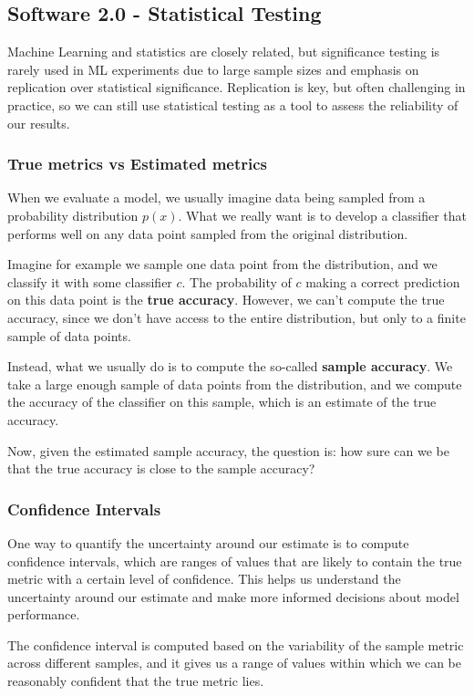 \subsection{Software 2.0 - Statistical Testing}
Machine Learning and statistics are closely related, but significance testing is rarely used in ML experiments 
due to large sample sizes and emphasis on replication over statistical significance.
Replication is key, but often challenging in practice, so we can still use statistical testing as a tool to assess the reliability of our results.

\subsubsection{True metrics vs Estimated metrics}
When we evaluate a model, we usually imagine data being sampled from a probability distribution $p(x)$.
What we really want is to develop a classifier that performs well on any data point sampled from the original distribution.

Imagine for example we sample one data point from the distribution, and we classify it with some classifier $c$.
The probability of $c$ making a correct prediction on this data point is the \textbf{true accuracy}.
However, we can't compute the true accuracy, since we don't have access to the entire distribution, but only to a finite sample of data points.

Instead, what we usually do is to compute the so-called \textbf{sample accuracy}. 
We take a large enough sample of data points from the distribution, and we compute the accuracy of the classifier on this sample, which is an estimate of the true accuracy.

Now, given the estimated sample accuracy, the question is: 
how sure can we be that the true accuracy is close to the sample accuracy?

\subsubsection*{Confidence Intervals}
One way to quantify the uncertainty around our estimate is to compute confidence intervals, which are ranges of values that are likely 
to contain the true metric with a certain level of confidence.
This helps us understand the uncertainty around our estimate and make more informed decisions about model performance.

The confidence interval is computed based on the variability of the sample metric across different samples, and it gives us a range of values within which we can be reasonably confident that the true metric lies.

